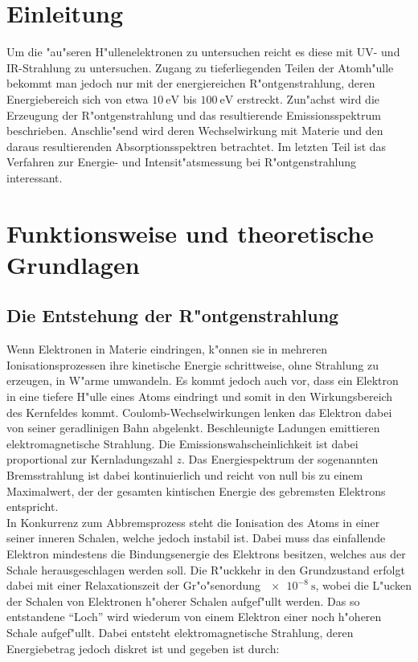\section{Einleitung}
\label{sec:einleitung}
	Um die "au"seren H"ullenelektronen zu untersuchen reicht es diese mit UV- und IR-Strahlung zu untersuchen. Zugang zu tieferliegenden Teilen der Atomh"ulle bekommt man jedoch nur mit der energiereichen R"ontgenstrahlung, deren Energiebereich sich von etwa $\SI{10}{\electronvolt}$ bis $\SI{100}{\electronvolt}$ erstreckt.
	\vspace{0.3cm}
	Zun"achst wird die Erzeugung der R"ontgenstrahlung und das resultierende Emissionsspektrum beschrieben. Anschlie"send wird deren Wechselwirkung mit Materie und den daraus resultierenden Absorptionsspektren betrachtet. Im letzten Teil ist das Verfahren zur Energie- und Intensit"atsmessung bei R"ontgenstrahlung interessant.

\section{Funktionsweise und theoretische Grundlagen}
\label{sec:funktionsweise}

	
	\subsection{Die Entstehung der R"ontgenstrahlung}
	\label{sub:entstehung}

		Wenn Elektronen in Materie eindringen, k"onnen sie in mehreren Ionisationsprozessen ihre kinetische Energie schrittweise, ohne Strahlung zu erzeugen, in W"arme umwandeln.
		Es kommt jedoch auch vor, dass ein Elektron in eine tiefere H"ulle eines Atoms eindringt und somit in den Wirkungsbereich des Kernfeldes kommt.
		Coulomb-Wechselwirkungen lenken das Elektron dabei von seiner geradlinigen Bahn abgelenkt.
		Beschleunigte Ladungen emittieren elektromagnetische Strahlung.
		Die E\-mis\-sions\-wah\-schein\-lich\-keit ist dabei proportional zur Kernladungszahl $z$.
		Das Energiespektrum der sogenannten Bremsstrahlung ist dabei kontinuierlich und reicht von null bis zu einem Maximalwert, der der gesamten kintischen Energie des gebremsten Elektrons entspricht.
		\\
		In Konkurrenz zum Abbremsprozess steht die Ionisation des Atoms in einer seiner inneren Schalen, welche jedoch instabil ist.
		Dabei muss das einfallende Elektron min\-des\-tens die Bindungsenergie des Elektrons besitzen, welches aus der Schale herausgeschlagen werden soll.
		Die R"uckkehr in den Grundzustand erfolgt dabei mit einer Relaxationszeit der Gr"o"senordung $\SI{e-8}{\second}$, wobei die L"ucken der Schalen von Elektronen h"oherer Schalen aufgef"ullt werden. 
		Das so entstandene "`Loch"' wird wiederum von einem Elektron einer noch h"oheren Schale aufgef"ullt.
		Dabei entsteht elektromagnetische Strahlung, deren Energiebetrag jedoch diskret ist und gegeben ist durch:

